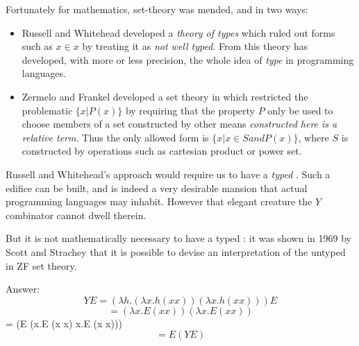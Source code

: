 Fortunately for mathematics, set-theory was mended, and in two ways:
\begin{itemize}
\item Russell and Whitehead developed a {\em theory of types} which ruled
out forms such as $x\in x$ by treating it as {\em not well typed}. From
this theory has developed, with more or less precision, the whole idea of
{\em type} in programming languages.
\item Zermelo and Frankel developed a set theory in which restricted the
problematic $\{x|P(x)\}$ by requiring that the property $P$ only be used to
choose members of a set constructed by other means {\em constructed here is
a relative term}. Thus the only allowed form is $\{x|x\in S and P(x)\}$,
where $S$ is constructed by operations such as cartesian product or
power set.
\end{itemize}

Russell and Whitehead's approach would require us to have a {\em typed}
\LC. Such a edifice can be built, and is indeed a very desirable mansion
that actual programming languages may inhabit. However that elegant
creature the $Y$ combinator cannot dwell therein.

But it is not mathematically necessary to have a typed \LC: it was shown in
1969 by Scott and Strachey that it is possible to devise an interpretation
of the untyped \LC in ZF set theory.




Answer:
$$YE = (\lambda h. (\lambda x.h (x x)) (\lambda x.h (x x))) E$$
$$ =  (\lambda x.E (x x)) (\lambda x.E (x x))
$$ =  (E (\lambda x.E (x x) \lambda x.E (x x)))
$$ =  E (YE) $$
